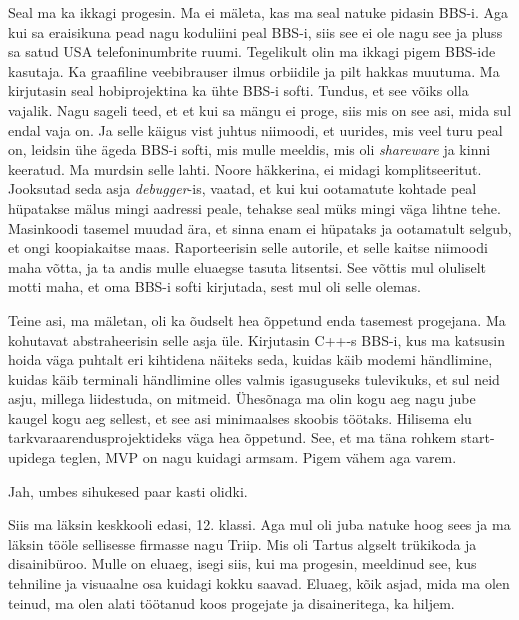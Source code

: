 
Seal ma ka ikkagi progesin. Ma ei mäleta, kas ma seal natuke pidasin BBS-i. Aga kui sa eraisikuna pead nagu koduliini peal BBS-i, siis see ei ole nagu see ja pluss sa satud  USA telefoninumbrite ruumi. Tegelikult olin ma ikkagi pigem BBS-ide kasutaja. Ka graafiline veebibrauser  ilmus orbiidile ja  pilt hakkas muutuma. Ma kirjutasin seal hobiprojektina ka ühte BBS-i softi. Tundus, et see võiks olla vajalik. Nagu sageli teed, et et kui sa mängu ei proge, siis mis on see asi, mida sul endal vaja on. Ja selle käigus vist juhtus niimoodi, et  uurides, mis veel turu peal on, leidsin ühe ägeda BBS-i softi, mis mulle meeldis, mis oli \emph{shareware} ja kinni keeratud. Ma murdsin selle lahti. Noore häkkerina, ei midagi  komplitseeritut. Jooksutad seda asja \emph{debugger}-is, vaatad, et kui kui ootamatute kohtade peal hüpatakse  mälus mingi aadressi peale, tehakse seal müks mingi väga lihtne tehe. Masinkoodi tasemel muudad ära, et sinna enam ei hüpataks ja ootamatult selgub, et ongi koopiakaitse maas. Raporteerisin selle autorile, et selle kaitse niimoodi maha võtta, ja ta andis mulle eluaegse tasuta litsentsi. See võttis mul oluliselt motti maha, et oma BBS-i softi kirjutada, sest mul oli selle olemas. 

Teine asi, ma mäletan,  oli ka õudselt hea õppetund  enda tasemest progejana. Ma kohutavat abstraheerisin selle asja üle. Kirjutasin C++-s BBS-i, kus ma katsusin hoida väga puhtalt eri kihtidena näiteks seda,  kuidas käib modemi händlimine, kuidas käib terminali händlimine olles valmis igasuguseks tulevikuks, et sul neid asju, millega liidestuda, on mitmeid. Ühesõnaga ma olin kogu aeg nagu jube  kaugel kogu aeg sellest, et see asi  minimaalses skoobis töötaks. Hilisema elu tarkvaraarendusprojektideks väga hea õppetund. See, et ma täna rohkem start-upidega teglen,  MVP on nagu kuidagi armsam. Pigem vähem aga varem.


Jah,  umbes sihukesed paar kasti olidki. 


Siis ma läksin keskkooli edasi, 12. klassi. Aga  mul oli juba natuke hoog sees ja ma läksin tööle sellisesse firmasse nagu Triip. Mis oli Tartus algselt trükikoda ja disainibüroo. Mulle on eluaeg, isegi siis, kui ma progesin, meeldinud see, kus tehniline ja visuaalne osa kuidagi kokku saavad. Eluaeg, kõik asjad, mida ma olen teinud, ma olen alati töötanud koos progejate ja disaineritega, ka hiljem.

